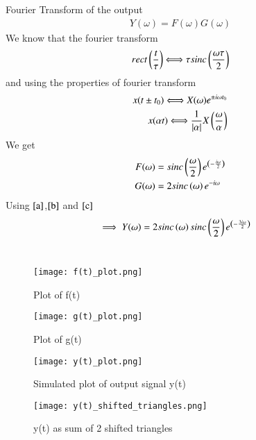 \documentclass[journal,12pt,twocolumn]{IEEEtran}
\begin{document}
Fourier Transform of the output
\begin{align}
    Y(\omega)=F(\omega)G(\omega)  \label{a}
\end{align}
We know that the fourier transform
\begin{align}
    rect\left(\frac{t}{\tau}\right)\Longleftrightarrow \tau sinc\left(\frac{\omega \tau}{2}\right)
\end{align}
and using the properties of fourier transform
\begin{align}
    x(t\pm t_0)\Longleftrightarrow X(\omega)e^{\pm i\omega t_0}\\
    x(\alpha t)\Longleftrightarrow \frac{1}{|\alpha|}X\left(\frac{\omega}{\alpha}\right)
\end{align}
We get
\begin{align}
    F(\omega) &= sinc\left(\frac{\omega}{2}\right)e^{\left(- \frac{i\omega}{2}\right)} \label{b}\\ 
    G(\omega) &= 2sinc\left(\omega\right)e^{-i\omega} \label{c}
\end{align}
Using $\eqref{a}$,$\eqref{b}$ and $\eqref{c}$
\begin{align}
    \implies Y(\omega) &= 2sinc\left(\omega\right)sinc\left(\frac{\omega}{2}\right)e^{\left(- \frac{3i\omega}{2}\right)}
\end{align}\\
\begin{figure}[!ht]
    \centering
    \texttt{[image: f(t)\_plot.png]}
    \caption{Plot of f(t)}
    \label{plot}
\end{figure}
\begin{figure}[!ht]
    \centering
    \texttt{[image: g(t)\_plot.png]}
    \caption{Plot of g(t)}
    \label{plot}
\end{figure}
\begin{figure}[!ht]
    \centering
    \texttt{[image: y(t)\_plot.png]}
    \caption{Simulated plot of output signal y(t)}
    \label{plot}
\end{figure}
\begin{figure}[!ht]
    \centering
    \texttt{[image: y(t)\_shifted\_triangles.png]}
    \caption{y(t) as sum of 2 shifted triangles}
    \label{plot}
\end{figure}
\end{document}

